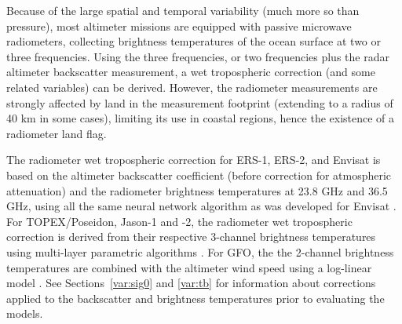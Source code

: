 \documentclass[a4paper,11pt,openany,natbib]{thesis}
\begin{document}
Because of the large spatial and temporal variability (much more so than pressure), most altimeter missions are equipped with passive microwave radiometers, collecting brightness temperatures of the ocean surface at two or three frequencies. Using the three frequencies, or two frequencies plus the radar altimeter backscatter measurement, a wet tropospheric correction (and some related variables) can be derived. However, the radiometer measurements are strongly affected by land in the measurement footprint (extending to a radius of 40 km in some cases), limiting its use in coastal regions, hence the existence of a radiometer land flag.

The radiometer wet tropospheric correction for ERS-1, ERS-2, and Envisat is based on the altimeter backscatter coefficient (before correction for atmospheric attenuation) and the radiometer brightness temperatures at 23.8 GHz and 36.5 GHz, using all the same neural network algorithm as was developed for Envisat \citep{labroue2003}. For TOPEX/Poseidon, Jason-1 and -2, the radiometer wet tropospheric correction is derived from their respective 3-channel brightness temperatures using multi-layer parametric algorithms  \citep{ruf1995c,dumont2001}. For GFO, the the 2-channel brightness temperatures are combined with the altimeter wind speed using a log-linear model \citep{ruf1996}. See Sections~\ref{var:sig0} and \ref{var:tb} for information about corrections applied to the backscatter and brightness temperatures prior to evaluating the models.
\end{document}
